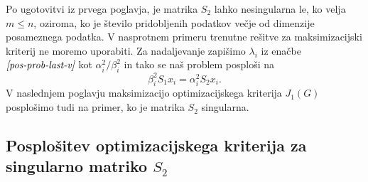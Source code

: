 \documentclass[mat1]{article}
\theoremstyle{definition}
\begin{document}
Po ugotovitvi iz prvega poglavja, je matrika $S_2$ lahko nesingularna le, ko velja $m \leq n$, oziroma, ko je število pridobljenih podatkov večje od dimenzije posameznega podatka. V nasprotnem primeru trenutne rešitve za maksimizacijski kriterij ne moremo uporabiti. Za nadaljevanje zapišimo $\lambda_i$ iz enačbe $\textit{\eqref{pos-prob-last-v}}$ kot $\alpha_i^2/\beta_i^2$ in tako se naš problem posploši na
\begin{equation} \label{alpha-beta}
\beta_i^2 S_1 x_i = \alpha_i^2 S_2 x_i
\text{.}
\end{equation}
V naslednjem poglavju maksimizacijo optimizacijskega kriterija $J_1(G)$ posplošimo tudi na primer, ko je matrika $S_2$ singularna.

\subsection{Posplošitev optimizacijskega kriterija za singularno matriko $S_2$}
\end{document}
